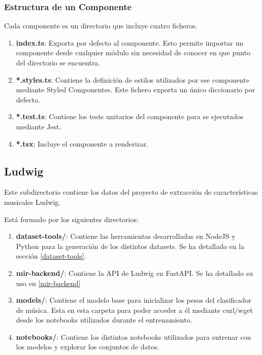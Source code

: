 \subsubsection{Estructura de un Componente}
Cada componente es un directorio que incluye cuatro ficheros.
\begin{enumerate}
    \item \textbf{index.ts}: Exporta por defecto al componente. Esto permite importar un componente desde cualquier módulo sin necesidad de conocer en que punto del directorio se encuentra.
    
    \item\textbf{*.styles.ts}: Contiene la definición de estilos utilizados por ese componente mediante Styled Componentes. Este fichero exporta un único diccionario por defecto.
    
    \item\textbf{*.test.ts}: Contiene los tests unitarios del componente para se ejecutados mediante Jest.
    
    \item\textbf{*.tsx}: Incluye el componente a renderizar. 
\end{enumerate}


\subsection{Ludwig}

Este subdirectorio contiene los datos del proyecto de extracción de características musicales Ludwig.

Está formado por los siguientes directorios:

\begin{enumerate}
    \item \textbf{dataset-tools/}: Contiene las herramientas desarrolladas en NodeJS y Python para la generación de los distintos datasets. Se ha detallado en la sección \ref{dataset-tools}.
    \item \textbf{mir-backend/}: Contiene la API de Ludwig en FastAPI. Se ha detallado su uso en \ref{mir-backend}
    \item \textbf{models/}: Contiene el modelo base para inicializar los pesos del clasificador de música. Esta en esta carpeta para poder acceder a él mediante curl/wget desde los notebooks utilizados durante el entrenamiento.
    \item \textbf{notebooks/}: Contiene los distintos notebooks utilizados para entrenar  con los modelos y explorar los conjuntos de datos. 
\end{enumerate}

